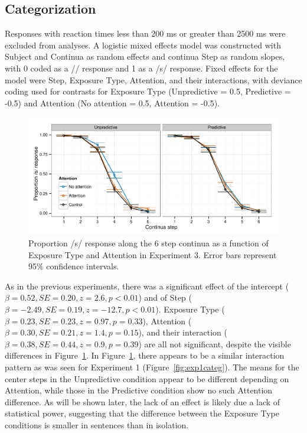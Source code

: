 \subsection{Categorization}

Responses with reaction times less than 200 ms or greater than 2500 ms were excluded from analyses. 
A logistic mixed effects model was constructed with Subject and Continua as random effects and continua Step as random slopes, with 0 coded as a /\textesh/ response and 1 as a /s/ response.  Fixed effects for the model were Step, Exposure Type, Attention, and their interactions, with deviance coding used for contrasts for Exposure Type (Unpredictive = 0.5, Predictive = -0.5) and Attention (No attention = 0.5, Attention = -0.5).


\begin{figure}[!ht]
\caption{Proportion /s/ response along the 6 step continua as a function of Exposure Type and Attention in Experiment 3.  Error bars represent 95\% confidence intervals.}
\label{fig:exp3categ}
\begin{center}
\includegraphics[width=\textwidth]{graphs/exp3_categresults}
\end{center}
\end{figure}

As in the previous experiments, there was a significant effect of the intercept ($\beta = 0.52, SE = 0.20, z = 2.6, p < 0.01$) and of Step ($\beta = -2.49, SE = 0.19, z = -12.7, p < 0.01$).
Exposure Type ($\beta = 0.23, SE = 0.23, z = 0.97, p = 0.33$), Attention ($\beta = 0.30, SE = 0.21, z = 1.4, p = 0.15$), and their interaction ($\beta = 0.38, SE = 0.44, z = 0.9, p = 0.39$) are all not significant, despite the visible differences in Figure~\ref{fig:exp3categ}.
In Figure~\ref{fig:exp3categ}, there appears to be a similar interaction pattern as was seen for Experiment 1 (Figure~\ref{fig:exp1categ}).
The means for the center steps in the Unpredictive condition appear to be different depending on Attention, while those in the Predictive condition show no such Attention difference.
As will be shown later, the lack of an effect is likely due a lack of statistical power, suggesting that the difference between the Exposure Type conditions is smaller in sentences than in isolation.

